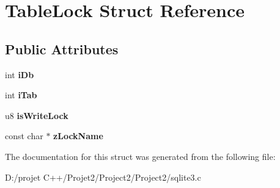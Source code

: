 \hypertarget{struct_table_lock}{}\section{Table\+Lock Struct Reference}
\label{struct_table_lock}
\subsection*{Public Attributes}
\begin{DoxyCompactItemize}
\item 
\mbox{\label{struct_table_lock_ad5cc726ef29ffcca39ec0b72942513f6}} 
int {\bfseries i\+Db}
\item 
\mbox{\label{struct_table_lock_ab25b5d9ba21ed96ed68ce8064ff84e24}} 
int {\bfseries i\+Tab}
\item 
\mbox{\label{struct_table_lock_a171121af9886ee08044d4b82b991ceeb}} 
u8 {\bfseries is\+Write\+Lock}
\item 
\mbox{\label{struct_table_lock_a204750eb60519f1a5984c320953badd5}} 
const char $\ast$ {\bfseries z\+Lock\+Name}
\end{DoxyCompactItemize}


The documentation for this struct was generated from the following file\+:\begin{DoxyCompactItemize}
\item 
D\+:/projet C++/\+Projet2/\+Project2/\+Project2/sqlite3.\+c\end{DoxyCompactItemize}
